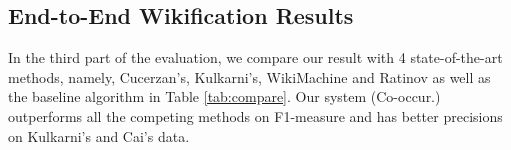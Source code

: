 %

\subsection{End-to-End Wikification Results}
In the third part of the evaluation, we compare our result with
4 state-of-the-art methods, namely, Cucerzan's\cite{cucerzan2007large},
Kulkarni's\cite{kulkarni2009collective}, WikiMachine\cite{Tonelli2012} and
Ratinov\cite{RatinovRDA11} as well as the baseline algorithm in Table \ref{tab:compare}.
Our system (Co-occur.) outperforms all the competing methods on F1-measure and
has better precisions on Kulkarni's and Cai's data.

